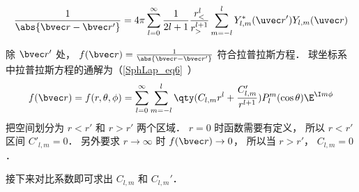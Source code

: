
\begin{issues}
\issueDraft
\end{issues}


\begin{equation}
\frac{1}{\abs{\bvec r - \bvec r'}} = 4\pi \sum_{l=0}^{\infty} \frac{1}{2l+1} \frac{r_<^l}{r_>^{l+1}} \sum_{m = -l}^l Y_{l,m}^*(\uvec r') Y_{l,m}(\uvec r)
\end{equation}

除 $\bvec r'$ 处， $f(\bvec r) = \frac{1}{\abs{\bvec r - \bvec r'}}$ 符合拉普拉斯方程． 球坐标系中拉普拉斯方程的通解为（\autoref{SphLap_eq6}~）
\begin{equation}
f(\bvec r) = f(r, \theta, \phi) = \sum_{l = 0}^\infty \sum_{m = -l}^l \qty(C_{l,m} r^l + \frac{C'_{l,m}}{r^{l+1}})P_l^m(\cos\theta)\E^{\I m\phi}
\end{equation}
把空间划分为 $r < r'$ 和 $r > r'$ 两个区域． $r = 0$ 时函数需要有定义， 所以 $r < r'$ 区间 $C'_{l,m} = 0$． 另外要求 $r \to \infty$ 时 $f(\bvec r) \to 0$， 所以当 $r > r'$， $C_{l,m} = 0$．

接下来对比系数即可求出 $C_{l,m}$ 和 $C_{l,m}'$．

